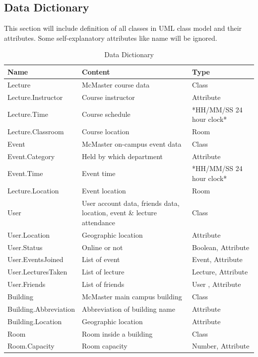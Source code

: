 \documentclass[12pt]{article}
\begin{document}
\subsection{Data Dictionary}
This section will include definition of all classes in UML class model and their attributes. Some self-explanatory attributes like name will be ignored.
\begin{longtable}
 {p{} | p{} | p{}}\caption{Data Dictionary} \label{TblDataDict}\\
  \toprule
  \textbf{Name} & \textbf{Content} & \textbf{Type}\\
  \midrule
  Lecture & McMaster course data & Class\\
  \midrule
  Lecture.Instructor & Course instructor & Attribute\\
  \midrule
  Lecture.Time & Course schedule & *HH/MM/SS
24 hour clock*\\
  \midrule
  Lecture.Classroom & Course location & Room\\
  \midrule
  Event & McMaster on-campus event data & Class\\
  \midrule
  Event.Category & Held by which department & Attribute\\
  \midrule
  Event.Time & Event time & *HH/MM/SS
24 hour clock*\\
  \midrule
  Lecture.Location & Event location & Room\\
  \midrule
  User & User account data, friends data, location,  event \& lecture attendance & Class\\
  \midrule
  User.Location & Geographic location & Attribute\\
  \midrule
  User.Status & Online or not & Boolean, Attribute\\
  \midrule
  User.EventsJoined & List of event & Event, Attribute\\
  \midrule
  User.LecturesTaken & List of lecture & Lecture, Attribute\\
  \midrule
  User.Friends & List of friends & User , Attribute\\
  \midrule
  Building & McMaster main campus building & Class\\
  \midrule
  Building.Abbreviation & Abbreviation of building name & Attribute\\
  \midrule
  Building.Location & Geographic location & Attribute\\
  \midrule
  Room & Room inside a building & Class\\
  \midrule
  Room.Capacity & Room capacity & Number, Attribute\\
  \bottomrule
\end{longtable}
\end{document}
